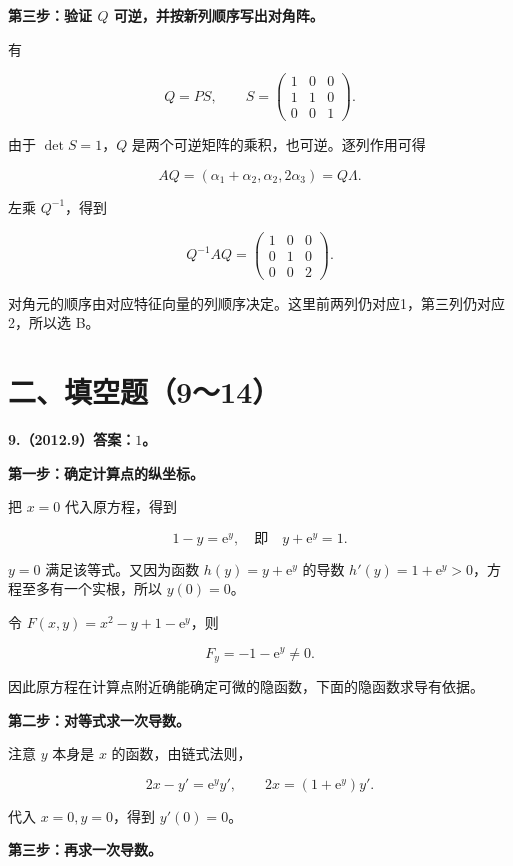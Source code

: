 \documentclass[UTF8,11pt,fontset=windows]{ctexart}
\begin{document}
\textbf{第三步：验证 $Q$ 可逆，并按新列顺序写出对角阵。}

有

$$
Q=PS,
\qquad
S=\begin{pmatrix}1&0&0\\1&1&0\\0&0&1\end{pmatrix}.
$$

由于 $\det S=1$，$Q$ 是两个可逆矩阵的乘积，也可逆。逐列作用可得

$$
AQ=(\alpha_1+\alpha_2,\alpha_2,2\alpha_3)=Q\Lambda.
$$

左乘 $Q^{-1}$，得到

$$
Q^{-1}AQ=\begin{pmatrix}1&0&0\\0&1&0\\0&0&2\end{pmatrix}.
$$

对角元的顺序由对应特征向量的列顺序决定。这里前两列仍对应1，第三列仍对应2，所以选 B。

\clearpage

\section*{二、填空题（9～14）}

\textbf{9.（2012.9）答案：$1$。}

\textbf{第一步：确定计算点的纵坐标。}

把 $x=0$ 代入原方程，得到

$$
1-y=\mathrm e^y,
\quad\text{即}\quad y+\mathrm e^y=1.
$$

$y=0$ 满足该等式。又因为函数 $h(y)=y+\mathrm e^y$ 的导数 $h'(y)=1+\mathrm e^y>0$，方程至多有一个实根，所以 $y(0)=0$。

令 $F(x,y)=x^2-y+1-\mathrm e^y$，则

$$
F_y=-1-\mathrm e^y\ne0.
$$

因此原方程在计算点附近确能确定可微的隐函数，下面的隐函数求导有依据。

\textbf{第二步：对等式求一次导数。}

注意 $y$ 本身是 $x$ 的函数，由链式法则，

$$
2x-y'=\mathrm e^y y',
\qquad
2x=(1+\mathrm e^y)y'.
$$

代入 $x=0,y=0$，得到 $y'(0)=0$。

\textbf{第三步：再求一次导数。}
\end{document}
